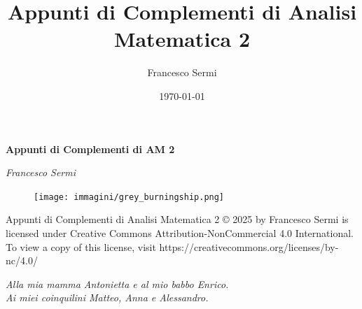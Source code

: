 \documentclass[12pt, twoside, italian]{book}
\title{Appunti di Complementi di Analisi Matematica 2}
\author{Francesco Sermi}
\date{\today}
\begin{document}
	\begin{titlepage}
	\centering
	\vspace*{3cm}
	{\huge\bfseries Appunti di Complementi di AM 2 \par}
	\vspace{2cm}
	{\Large\itshape Francesco Sermi\par}
	\vfill
	\begin{figure}[H]
		\centering
		\texttt{[image: immagini/grey\_burningship.png]}
	\end{figure}




	\vfill	
	\end{titlepage}
	\pagestyle{empty}
	\vspace*{\fill}
	Appunti di Complementi di Analisi Matematica 2 © 2025 by Francesco Sermi is licensed under Creative Commons Attribution-NonCommercial 4.0 International. To view a copy of this license, visit https://creativecommons.org/licenses/by-nc/4.0/
	\cleardoublepage
	\vspace*{8cm}
	\begin{center}
			\begin{flushright}
				\small\emph{Alla mia mamma Antonietta e al mio babbo Enrico. \\
				Ai miei coinquilini Matteo, Anna e Alessandro. \\
				}
			\end{flushright}
		\vspace*{\fill}
	\end{center}
	\cleardoublepage
	\pagestyle{fancy}
	\tableofcontents
\end{document}
